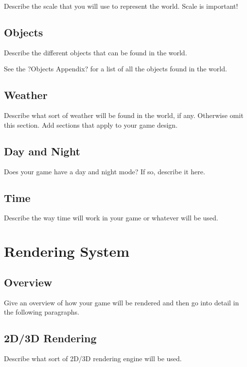 \documentclass[a4paper]{report}
\begin{document}
				Describe the scale that you will use to represent the world.  Scale is important!	

		\subsection{Objects}

			Describe the different objects that can be found in the world.

			See the ?Objects Appendix? for a list of all the objects found in the world.

		\subsection{Weather}

			Describe what sort of weather will be found in the world, if any.  Otherwise omit this section.  Add sections that apply to your game design.

		\subsection{Day and Night}

			Does your game have a day and night mode?  If so, describe it here.

		\subsection{Time}

			Describe the way time will work in your game or whatever will be used.

	\section{Rendering System}

		\subsection{Overview}

			Give an overview of how your game will be rendered and then go into detail in the following paragraphs.

		\subsection{2D/3D Rendering}

			Describe what sort of 2D/3D rendering engine will be used.
\end{document}
